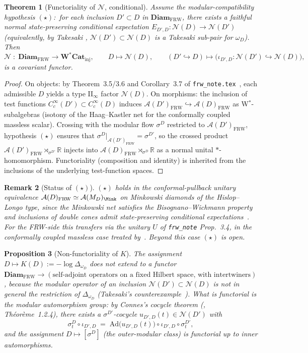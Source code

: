 \documentclass[11pt]{article}
\newtheorem{theorem}{Theorem}
\newtheorem{proposition}[theorem]{Proposition}
\newtheorem{remark}[theorem]{Remark}
\newcommand{\AA}{\mathcal{A}}
\newcommand{\NN}{\mathcal{N}}
\newcommand{\FRW}{{\mathrm{FRW}}}
\newcommand{\R}{\mathbb{R}}
\newcommand{\Diam}{\mathbf{Diam}_\FRW}
\newcommand{\WCatinj}{\mathbf{W^{*}\!Cat}_{\mathrm{inj}}}
\begin{document}
\begin{theorem}[Functoriality of $\NN$, conditional]\label{thm:N-functor}
Assume the modular-compatibility hypothesis $(\star)$:\ for each
inclusion $D'\subset D$ in $\Diam$, there exists a faithful normal
state-preserving conditional expectation
$E_{D',D}:\NN(D)\to\NN(D')$ (equivalently, by Takesaki
\cite{Takesaki1972}, $\NN(D')\subset\NN(D)$ is a Takesaki sub-pair
for $\omega_D$). Then
\[
\NN \;:\; \Diam \longrightarrow \WCatinj,
\qquad
D \mapsto \NN(D), \qquad
(D'\hookrightarrow D)\mapsto\bigl(\iota_{D',D}:\NN(D')\hookrightarrow\NN(D)\bigr),
\]
is a covariant functor.
\end{theorem}

\begin{proof}
On objects: by Theorem~3.5/3.6 and Corollary~3.7 of
\texttt{frw\_note.tex}~\cite{Remondiere2026}, each admissible $D$
yields a type II$_\infty$ factor $\NN(D)$. On morphisms: the
inclusion of test functions $C_c^\infty(D')\subset C_c^\infty(D)$
induces $\AA(D')_\FRW\hookrightarrow\AA(D)_\FRW$ as W$^*$-subalgebras
(isotony of the Haag--Kastler net for the conformally coupled
massless scalar). Crossing with the modular flow $\sigma^D$
restricted to $\AA(D')_\FRW$, hypothesis $(\star)$ ensures that
$\sigma^D|_{\AA(D')_\FRW}=\sigma^{D'}$, so the crossed product
$\AA(D')_\FRW\rtimes_{\sigma^{D'}}\R$ injects into
$\AA(D)_\FRW\rtimes_{\sigma^D}\R$ as a normal unital
$*$-homomorphism. Functoriality (composition and identity) is
inherited from the inclusions of the underlying test-function
spaces.
\end{proof}

\begin{remark}[Status of $(\star)$]\label{rem:star}
$(\star)$ holds in the conformal-pullback unitary equivalence
$\AA(D)_\FRW\simeq\AA(M_D)_\Mink$ on Minkowski diamonds of the
Hislop--Longo type, since the Minkowski net satisfies the
Bisognano--Wichmann property and inclusions of double cones admit
state-preserving conditional expectations~\cite{Longo1979,
Buchholz1974}. For the FRW-side this transfers via the unitary
$U$ of \texttt{frw\_note} Prop.~3.4, in the conformally coupled
massless case treated by~\cite{Remondiere2026}. Beyond this case
$(\star)$ is open.
\end{remark}

\begin{proposition}[Non-functoriality of $K$]\label{prop:K-not-functor}
The assignment $D\mapsto K(D):=-\log\Delta_{\omega_D}$ does
\emph{not} extend to a functor $\Diam\to(\text{self-adjoint
operators on a fixed Hilbert space, with intertwiners})$, because
the modular operator of an inclusion $\NN(D')\subset\NN(D)$ is not
in general the restriction of $\Delta_{\omega_D}$ (Takesaki's
counterexample~\cite{Takesaki1972}). What \emph{is} functorial is
the modular automorphism \emph{group}: by Connes's cocycle theorem
(\cite{Connes1973}, Th\'eor\`eme~1.2.4), there exists a
$\sigma^{D'}$-cocycle $u_{D',D}(t)\in\NN(D')$ with
\[
\sigma^D_t \circ \iota_{D',D} \;=\; \mathrm{Ad}\bigl(u_{D',D}(t)\bigr)\circ \iota_{D',D}\circ\sigma^{D'}_t,
\]
and the assignment $D\mapsto[\sigma^D]$ (the outer-modular class) is
functorial up to inner automorphisms.
\end{proposition}
\end{document}
